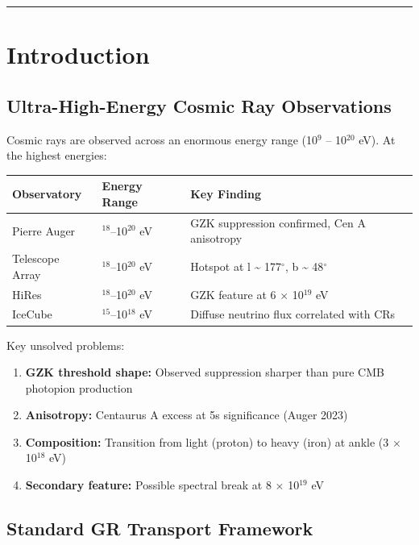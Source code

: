 \documentclass[12pt,a4paper]{article}
\begin{document}
\medskip\hrule\medskip

\section{Introduction}

\subsection{Ultra-High-Energy Cosmic Ray Observations}

Cosmic rays are observed across an enormous energy range (10$^{9}$ -- 10$^{20}$ eV). At the highest energies:

\begin{table}[H]
\centering
\small
\begin{tabularx}{\linewidth}{@{}>{\raggedright\arraybackslash}X>{\raggedright\arraybackslash}X>{\raggedright\arraybackslash}X@{}}
\toprule
Observatory & Energy Range & Key Finding \tabularnewline
\midrule
Pierre Auger & 10$^{18}$--10$^{20}$ eV & GZK suppression confirmed, Cen A anisotropy \tabularnewline
Telescope Array & 10$^{18}$--10$^{20}$ eV & Hotspot at l \textasciitilde{} 177$^\circ$, b \textasciitilde{} 48$^\circ$ \tabularnewline
HiRes & 10$^{18}$--10$^{20}$ eV & GZK feature at 6 $\times$ 10$^{19}$ eV \tabularnewline
IceCube & 10$^{15}$--10$^{18}$ eV & Diffuse neutrino flux correlated with CRs \tabularnewline
\bottomrule
\end{tabularx}
\end{table}

Key unsolved problems:

\begin{enumerate}
  \item \textbf{GZK threshold shape:} Observed suppression sharper than pure CMB photopion production
  \item \textbf{Anisotropy:} Centaurus A excess at 5s significance (Auger 2023)
  \item \textbf{Composition:} Transition from light (proton) to heavy (iron) at ankle (3 $\times$ 10$^{18}$ eV)
  \item \textbf{Secondary feature:} Possible spectral break at 8 $\times$ 10$^{19}$ eV
\end{enumerate}

\subsection{Standard GR Transport Framework}
\end{document}
